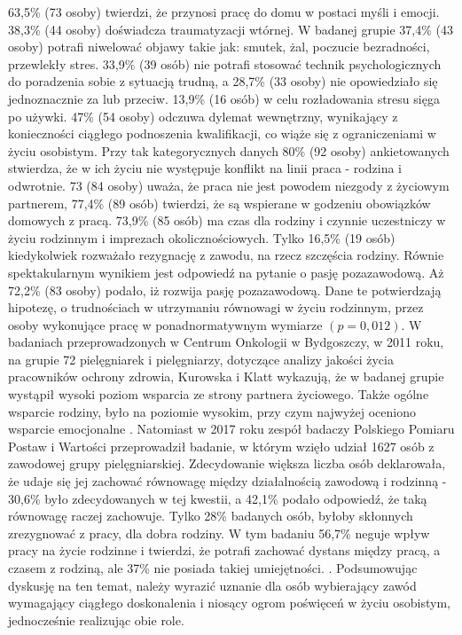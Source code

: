 \documentclass[a4paper,12pt,twoside,openright]{mwrep}
\begin{document}
  63,5\%  (73 osoby) twierdzi, że przynosi pracę do domu w postaci myśli i emocji. 38,3\% (44 osoby) doświadcza traumatyzacji wtórnej. W badanej grupie 37,4\%  (43 osoby) potrafi niwelować objawy takie jak: smutek, żal, poczucie bezradności, przewlekły stres. 33,9\%  (39 osób) nie potrafi stosować technik psychologicznych do poradzenia sobie z sytuacją trudną, a 28,7\%  (33 osoby) nie opowiedziało się jednoznacznie za lub przeciw. 13,9\% (16 osób) w celu rozładowania stresu sięga po używki. 47\% (54 osoby) odczuwa dylemat wewnętrzny, wynikający z konieczności ciągłego podnoszenia kwalifikacji, co wiąże się z ograniczeniami w życiu osobistym. Przy tak kategorycznych danych 80\% (92 osoby) ankietowanych stwierdza, że w ich życiu nie występuje konflikt na linii praca - rodzina i odwrotnie. 73 (84 osoby) uważa, że praca nie jest powodem niezgody z życiowym partnerem, 77,4\%  (89 osób) twierdzi, że są wspierane w godzeniu obowiązków domowych z pracą. 73,9\% (85 osób) ma czas dla rodziny i czynnie uczestniczy w życiu rodzinnym i imprezach okolicznościowych. Tylko 16,5\% (19 osób) kiedykolwiek rozważało rezygnację z zawodu, na rzecz szczęścia rodziny. Równie spektakularnym wynikiem jest odpowiedź na pytanie o pasję pozazawodową. Aż 72,2\% (83 osoby) podało, iż rozwija pasję pozazawodową. Dane te potwierdzają hipotezę, o trudnościach w utrzymaniu równowagi  w życiu rodzinnym, przez osoby wykonujące pracę w ponadnormatywnym wymiarze  $( p=0,012)$. W badaniach  przeprowadzonych w Centrum Onkologii w Bydgoszczy, w 2011 roku, na grupie 72 pielęgniarek i pielęgniarzy, dotyczące analizy jakości życia pracowników ochrony zdrowia, Kurowska i Klatt  wykazują, że w badanej grupie wystąpił wysoki poziom wsparcia ze strony partnera życiowego. Także ogólne wsparcie rodziny, było na poziomie wysokim, przy czym najwyżej oceniono wsparcie emocjonalne \cite{poziom}. Natomiast w 2017 roku zespół badaczy Polskiego Pomiaru Postaw i Wartości przeprowadził badanie, w którym wzięło udział 1627 osób z zawodowej grupy pielęgniarskiej. Zdecydowanie większa liczba osób deklarowała, że udaje się jej zachować równowagę między działalnością zawodową i rodzinną - 30,6\% było zdecydowanych w tej kwestii, a 42,1\% podało odpowiedź, że taką równowagę raczej zachowuje. Tylko 28\% badanych osób, byłoby skłonnych zrezygnować z pracy, dla dobra rodziny. W tym badaniu  56,7\% neguje wpływ pracy na życie rodzinne i twierdzi, że potrafi zachować dystans między pracą, a czasem z rodziną, ale 37\% nie posiada takiej umiejętności. \cite{komunikat}.
Podsumowując dyskusję na ten temat, należy wyrazić uznanie dla osób wybierający zawód wymagający ciągłego doskonalenia i niosący ogrom poświęceń w życiu osobistym, jednocześnie realizując obie role.
\end{document}
